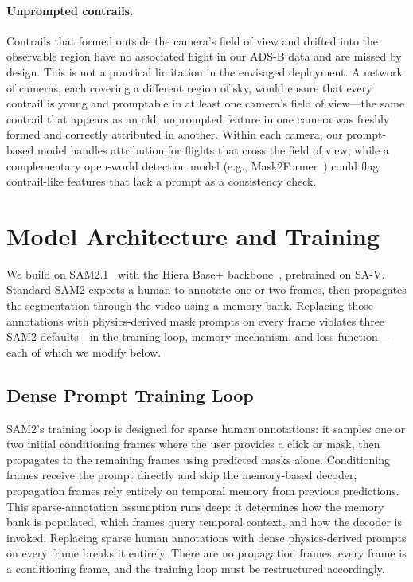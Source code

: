 \documentclass[review]{elsarticle}
\begin{document}
\paragraph{Unprompted contrails.} Contrails that formed outside the camera's field of view and drifted into the observable region have no associated flight in our ADS-B data and are missed by design. This is not a practical limitation in the envisaged deployment. A network of cameras, each covering a different region of sky, would ensure that every contrail is young and promptable in at least one camera's field of view---the same contrail that appears as an old, unprompted feature in one camera was freshly formed and correctly attributed in another. Within each camera, our prompt-based model handles attribution for flights that cross the field of view, while a complementary open-world detection model (e.g., Mask2Former~\cite{jarry2025gvccs}) could flag contrail-like features that lack a prompt as a consistency check.

\section{Model Architecture and Training}
\label{sec:architecture}

We build on SAM2.1~\cite{ravi2024sam2} with the Hiera Base+ backbone~\cite{ryali2023hiera}, pretrained on SA-V. Standard SAM2 expects a human to annotate one or two frames, then propagates the segmentation through the video using a memory bank. Replacing those annotations with physics-derived mask prompts on every frame violates three SAM2 defaults---in the training loop, memory mechanism, and loss function---each of which we modify below.

\subsection{Dense Prompt Training Loop}

SAM2's training loop is designed for sparse human annotations: it samples one or two initial conditioning frames where the user provides a click or mask, then propagates to the remaining frames using predicted masks alone. Conditioning frames receive the prompt directly and skip the memory-based decoder; propagation frames rely entirely on temporal memory from previous predictions. This sparse-annotation assumption runs deep: it determines how the memory bank is populated, which frames query temporal context, and how the decoder is invoked. Replacing sparse human annotations with dense physics-derived prompts on every frame breaks it entirely. There are no propagation frames, every frame is a conditioning frame, and the training loop must be restructured accordingly.
\end{document}
